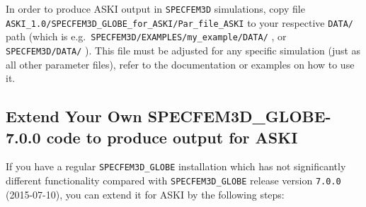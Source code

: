 \documentclass[12pt,a4paper]{article}
\newcommand{\lcode}[1]{\nolinkurl{#1}}
\newcommand{\lcodetitle}[1]{ {\ttfamily #1} }
\newcommand{\ASKI}{ {\ttfamily ASKI} }
\begin{document}
In order to produce \ASKI output in \lcode{SPECFEM3D} simulations, copy file 
\lcode{ASKI_1.0/SPECFEM3D_GLOBE_for_ASKI/Par_file_ASKI} to your respective \lcode{DATA/} path
(which is e.g.\ \lcode{SPECFEM3D/EXAMPLES/my_example/DATA/} , or \lcode{SPECFEM3D/DATA/} ). This 
file must be adjusted for any specific simulation (just as all other parameter files), 
refer to the documentation or examples on how to use it.


\subsection{Extend Your Own \lcodetitle{SPECFEM3D\_GLOBE-7.0.0} code to produce output for \ASKI} \label{extent_to_ASKI}
If you have a regular \lcode{SPECFEM3D_GLOBE} installation which has not significantly
different functionality compared with \lcode{SPECFEM3D_GLOBE} release version \lcode{7.0.0}
(2015-07-10), you can extend it for \ASKI by the following steps:
\end{document}
